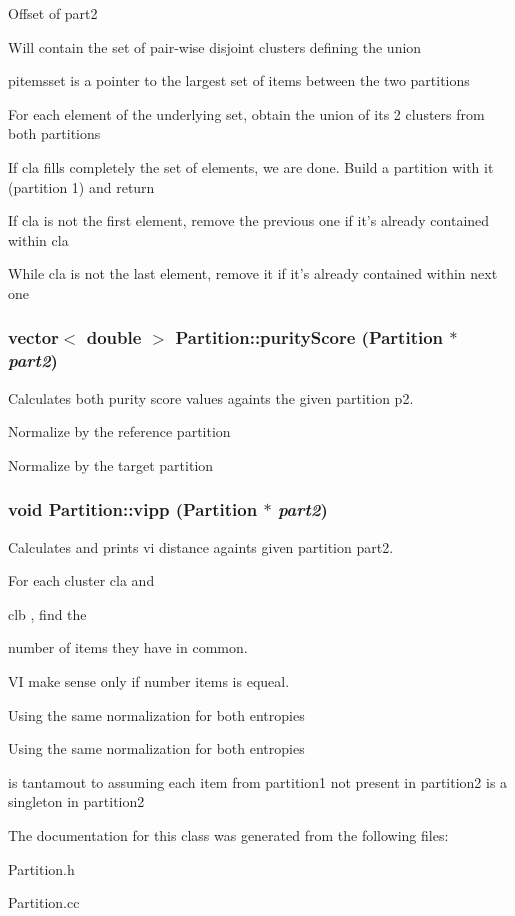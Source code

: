 Offset of part2

Will contain the set of pair-wise disjoint clusters defining the union

pitemsset is a pointer to the largest set of items between the two partitions

For each element of the underlying set, obtain the union of its 2 clusters from both partitions

If cla fills completely the set of elements, we are done. Build a partition with it (partition 1) and return

If cla is not the first element, remove the previous one if it's already contained within cla

While cla is not the last element, remove it if it's already contained within next one 
\subsubsection{\setlength{\rightskip}{0pt plus 5cm}vector$<$ double $>$ Partition::purity\-Score ({\bf Partition} $\ast$ {\em part2})}\label{classPartition_a44}


Calculates both purity score values againts the given partition p2. 

Normalize by the reference partition

Normalize by the target partition 
\subsubsection{\setlength{\rightskip}{0pt plus 5cm}void Partition::vipp ({\bf Partition} $\ast$ {\em part2})}\label{classPartition_a39}


Calculates and prints vi distance againts given partition part2. 

For each cluster cla and

clb , find the 

number of items they have in common.

VI make sense only if number items is equeal.

Using the same normalization for both entropies

Using the same normalization for both entropies

is tantamout to assuming each item from partition1 not present in partition2 is a singleton in partition2 

The documentation for this class was generated from the following files:\begin{CompactItemize}
\item 
Partition.h\item 
Partition.cc\end{CompactItemize}
